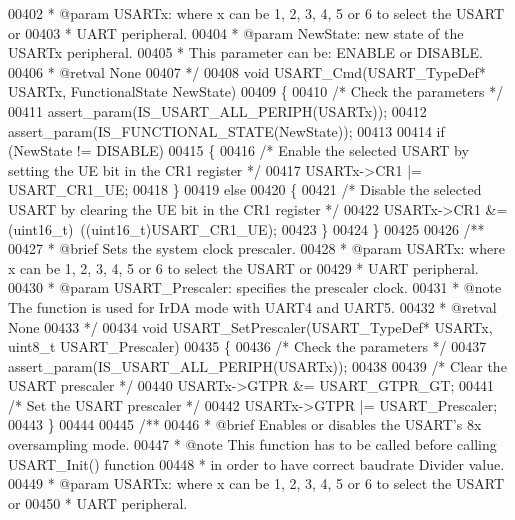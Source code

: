 \begin{DoxyCode}
00402 \textcolor{comment}{  * @param  USARTx: where x can be 1, 2, 3, 4, 5 or 6 to select the USART or }
00403 \textcolor{comment}{  *         UART peripheral.}
00404 \textcolor{comment}{  * @param  NewState: new state of the USARTx peripheral.}
00405 \textcolor{comment}{  *          This parameter can be: ENABLE or DISABLE.}
00406 \textcolor{comment}{  * @retval None}
00407 \textcolor{comment}{  */}
00408 \textcolor{keywordtype}{void} USART_Cmd(USART\_TypeDef* USARTx, FunctionalState NewState)
00409 \{
00410   \textcolor{comment}{/* Check the parameters */}
00411   assert_param(IS\_USART\_ALL\_PERIPH(USARTx));
00412   assert_param(IS\_FUNCTIONAL\_STATE(NewState));
00413 
00414   \textcolor{keywordflow}{if} (NewState != DISABLE)
00415   \{
00416     \textcolor{comment}{/* Enable the selected USART by setting the UE bit in the CR1 register */}
00417     USARTx->CR1 |= USART_CR1_UE;
00418   \}
00419   \textcolor{keywordflow}{else}
00420   \{
00421     \textcolor{comment}{/* Disable the selected USART by clearing the UE bit in the CR1 register */}
00422     USARTx->CR1 &= (uint16\_t)~((uint16\_t)USART_CR1_UE);
00423   \}
00424 \}
00425 
00426 \textcolor{comment}{/**}
00427 \textcolor{comment}{  * @brief  Sets the system clock prescaler.}
00428 \textcolor{comment}{  * @param  USARTx: where x can be 1, 2, 3, 4, 5 or 6 to select the USART or }
00429 \textcolor{comment}{  *         UART peripheral.}
00430 \textcolor{comment}{  * @param  USART\_Prescaler: specifies the prescaler clock. }
00431 \textcolor{comment}{  * @note   The function is used for IrDA mode with UART4 and UART5.   }
00432 \textcolor{comment}{  * @retval None}
00433 \textcolor{comment}{  */}
00434 \textcolor{keywordtype}{void} USART_SetPrescaler(USART\_TypeDef* USARTx, uint8\_t USART\_Prescaler)
00435 \{
00436   \textcolor{comment}{/* Check the parameters */}
00437   assert_param(IS\_USART\_ALL\_PERIPH(USARTx));
00438 
00439   \textcolor{comment}{/* Clear the USART prescaler */}
00440   USARTx->GTPR &= USART_GTPR_GT;
00441   \textcolor{comment}{/* Set the USART prescaler */}
00442   USARTx->GTPR |= USART\_Prescaler;
00443 \}
00444 
00445 \textcolor{comment}{/**}
00446 \textcolor{comment}{  * @brief  Enables or disables the USART's 8x oversampling mode.}
00447 \textcolor{comment}{  * @note   This function has to be called before calling USART\_Init() function}
00448 \textcolor{comment}{  *         in order to have correct baudrate Divider value.}
00449 \textcolor{comment}{  * @param  USARTx: where x can be 1, 2, 3, 4, 5 or 6 to select the USART or }
00450 \textcolor{comment}{  *         UART peripheral.}

\end{DoxyCode}
